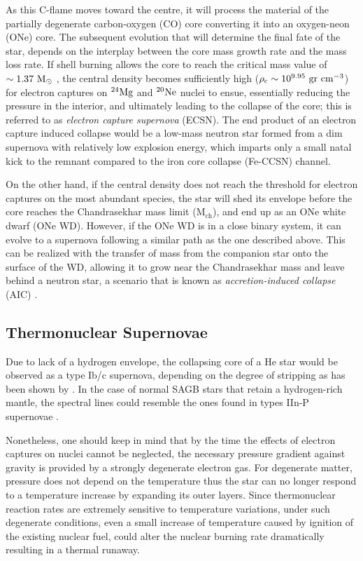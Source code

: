 \documentclass[../../main/thesis_msc.tex]{subfiles}
\begin{document}
As this C-flame moves toward the centre, it will process the material of the partially degenerate carbon-oxygen (CO) core converting it into an oxygen-neon (ONe) core. The subsequent evolution that will determine the final fate of the star, depends on the interplay between the core mass growth rate and the mass loss rate. If shell burning allows the core to reach the critical mass value of $\rm \sim 1.37 \ M_{\odot}$ \citep{Nomoto1984}, the central density becomes sufficiently high ($\rm \rho_c \sim 10^{9.95} \ gr \ cm^{-3}$) for electron captures on $\rm ^{24}Mg$ and $\rm ^{20}Ne$ nuclei to ensue, essentially reducing the pressure in the interior, and ultimately leading to the collapse of the core; this is referred to as \textit{electron capture supernova} (ECSN).
The end product of an electron capture induced collapse would be a low-mass neutron star formed from a dim supernova \citep[e.g.][and references therein]{Fischer2010} with relatively low explosion energy, which imparts only a small natal kick to the remnant \citep{Knigge2011, Jones_2013, Jones2016} compared to the iron core collapse (Fe-CCSN) channel.

On the other hand, if the central density does not reach the threshold for electron captures on the most abundant species, the star will shed its envelope before the core reaches the Chandrasekhar mass limit (M$_{\text{ch}}$), and end up as an ONe white dwarf (ONe WD). However, if the ONe WD is in a close binary system, it can evolve to a supernova following a similar path as the one described above. This can be realized with the transfer of mass from the companion star onto the surface of the WD, allowing it to grow near the Chandrasekhar mass and leave behind a neutron star, a scenario that is known as \textit{accretion-induced collapse} (AIC) \citep[e.g.][]{nomoto1991, Schwab:2015bma, Brooks2017a, Schwab:2018cnb}.

\subsection{Thermonuclear Supernovae} \label{sec:thermonuclearSNe}
Due to lack of a hydrogen envelope, the collapsing core of a He star would be observed as a type Ib/c supernova, depending on the degree of stripping as has been shown by \cite{Tauris2013, Tauris_ultra}. In the case of normal SAGB stars that retain a hydrogen-rich mantle, the spectral lines could resemble the ones found in types IIn-P supernovae \citep[see][for details]{Moriya2014}.

Nonetheless, one should keep in mind that by the time the effects of electron captures on nuclei cannot be neglected, the necessary pressure gradient against gravity is provided by a strongly degenerate electron gas. For degenerate matter, pressure does not depend on the temperature thus the star can no longer respond to a temperature increase by expanding its outer layers. Since thermonuclear reaction rates are extremely sensitive to temperature variations, under such degenerate conditions, even a small increase of temperature caused by ignition of the existing nuclear fuel, could alter the nuclear burning rate dramatically resulting in a thermal runaway.
\end{document}
